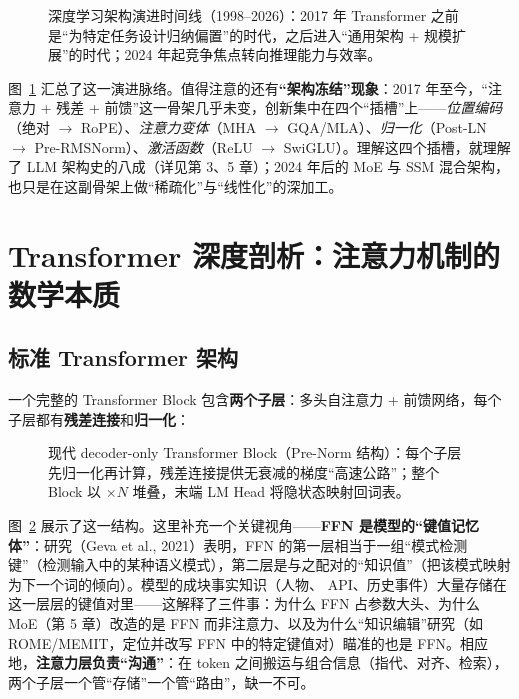 \documentclass[12pt,a4paper]{article}
\begin{document}
\begin{figure}[htbp]
\centering
\resizebox{\textwidth}{!}{%

}%
\caption{深度学习架构演进时间线（1998--2026）：2017 年 Transformer 之前是“为特定任务设计归纳偏置”的时代，之后进入“通用架构 + 规模扩展”的时代；2024 年起竞争焦点转向推理能力与效率。}
\label{fig:timeline}
\end{figure}

图~\ref{fig:timeline} 汇总了这一演进脉络。值得注意的还有\textbf{“架构冻结”现象}：2017 年至今，“注意力 + 残差 + 前馈”这一骨架几乎未变，创新集中在四个“插槽”上——\emph{位置编码}（绝对 $\to$ RoPE）、\emph{注意力变体}（MHA $\to$ GQA/MLA）、\emph{归一化}（Post-LN $\to$ Pre-RMSNorm）、\emph{激活函数}（ReLU $\to$ SwiGLU）。理解这四个插槽，就理解了 LLM 架构史的八成（详见第 3、5 章）；2024 年后的 MoE 与 SSM 混合架构，也只是在这副骨架上做“稀疏化”与“线性化”的深加工。
\section{Transformer 深度剖析：注意力机制的数学本质}
\subsection{标准 Transformer 架构}
一个完整的 Transformer Block 包含\textbf{两个子层}：多头自注意力 + 前馈网络，每个子层都有\textbf{残差连接}和\textbf{归一化}：

\begin{figure}[htbp]
\centering

\caption{现代 decoder-only Transformer Block（Pre-Norm 结构）：每个子层先归一化再计算，残差连接提供无衰减的梯度“高速公路”；整个 Block 以 $\times N$ 堆叠，末端 LM Head 将隐状态映射回词表。}
\label{fig:block}
\end{figure}

图~\ref{fig:block} 展示了这一结构。这里补充一个关键视角——\textbf{FFN 是模型的“键值记忆体”}：研究（Geva et al., 2021）表明，FFN 的第一层相当于一组“模式检测键”（检测输入中的某种语义模式），第二层是与之配对的“知识值”（把该模式映射为下一个词的倾向）。模型的成块事实知识（人物、 API、历史事件）大量存储在这一层层的键值对里——这解释了三件事：为什么 FFN 占参数大头、为什么 MoE（第 5 章）改造的是 FFN 而非注意力、以及为什么“知识编辑”研究（如 ROME/MEMIT，定位并改写 FFN 中的特定键值对）瞄准的也是 FFN。相应地，\textbf{注意力层负责“沟通”}：在 token 之间搬运与组合信息（指代、对齐、检索），两个子层一个管“存储”一个管“路由”，缺一不可。
\end{document}
